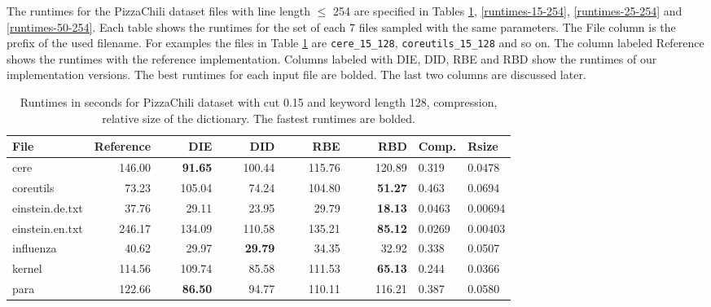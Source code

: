 \documentclass[english,twoside,censored,csm,algorithms-track-2020]{HYthesisML}
\theoremstyle{plain}
\theoremstyle{definition}
\begin{document}
The runtimes for the PizzaChili dataset files with line length $\leq$ 254 are specified in
Tables \ref{runtimes-15-128},
\ref{runtimes-15-254}, \ref{runtimes-25-254} and \ref{runtimes-50-254}. Each table shows the
runtimes for the set of each 7 files sampled with the same parameters. The File column is the
prefix of the used filename. For examples the files in Table \ref{runtimes-15-128} are
\texttt{cere\_15\_128}, \texttt{coreutils\_15\_128} and so on. The column labeled Reference shows
the runtimes with the reference implementation. Columns labeled with DIE, DID, RBE and RBD show the
runtimes of our implementation versions. The best runtimes for each input file are bolded.
The last two columns are discussed later.

\begin{center}
  \begin{table}
  \begin{tabular} {| l |r r r r r|l l|}
    \hline
    \textbf{File} & \textbf{Reference} & ~~~~\textbf{DIE} & ~~~~\textbf{DID} & ~~~~\textbf{RBE} & ~~~~\textbf{RBD} & \textbf{Comp.} & \textbf{Rsize} \\
    \hline
    cere & 146.00 & \textbf{91.65} & 100.44 & 115.76 & 120.89            & 0.319  & 0.0478  \\
    coreutils & 73.23 & 105.04 & 74.24 & 104.80 & \textbf{51.27}         & 0.463  & 0.0694  \\
    einstein.de.txt & 37.76 & 29.11 & 23.95 & 29.79 & \textbf{18.13}     & 0.0463 & 0.00694 \\
    einstein.en.txt & 246.17 & 134.09 & 110.58 & 135.21 & \textbf{85.12} & 0.0269 & 0.00403 \\
    influenza & 40.62 & 29.97 & \textbf{29.79} & 34.35 & 32.92           & 0.338  & 0.0507  \\
    kernel & 114.56 & 109.74 & 85.58 & 111.53 & \textbf{65.13}           & 0.244  & 0.0366  \\
    para & 122.66 & \textbf{86.50} & 94.77 & 110.11 & 116.21             & 0.387  & 0.0580  \\
    \hline
  \end{tabular}
  \caption{Runtimes in seconds for PizzaChili dataset with cut 0.15 and keyword length 128, compression, relative size of the dictionary. The fastest runtimes are bolded.}
  \label{runtimes-15-128}
  \end{table}
\end{center}
\end{document}
